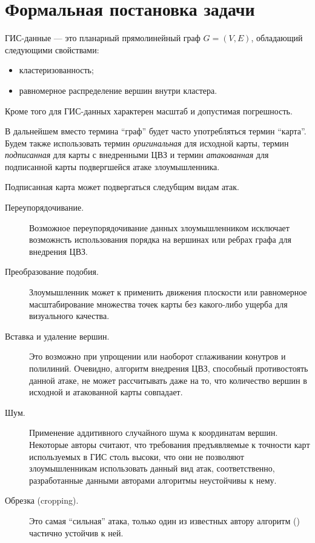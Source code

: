 \section{Формальная постановка задачи}
\label{sec:prob_def}

ГИС-данные --- это планарный прямолинейный граф $G = (V, E)$, обладающий следующими свойствами:
\begin{itemize}
    \item кластеризованность;
    \item равномерное распределение вершин внутри кластера.
\end{itemize}
Кроме того для ГИС-данных характерен масштаб и допустимая погрешность.

В дальнейшем вместо термина ``граф'' будет часто употребляться термин ``карта''. Будем также использовать термин 
\textit{оригинальная} для исходной карты, термин \textit{подписанная} для карты с внедренными 
ЦВЗ и термин \textit{атакованная} для подписанной карты подвергшейся атаке злоумышленника.

Подписанная карта может подвергаться следубщим видам атак.
\begin{description}
    \item[Переупорядочивание.] Возможное переупорядочивание данных злоумышленником исключает возможнсть 
    использования порядка на вершинах или ребрах графа для внедрения ЦВЗ.
    \item[Преобразование подобия.] Злоумышленник может к применить движения плоскости или 
    равномерное масштабирование множества точек карты без какого-либо ущерба для визуального качества. 
    \item[Вставка и удаление вершин.] Это возможно при упрощении или наоборот сглаживании конутров и полилиний. 
    Очевидно, алгоритм внедрения ЦВЗ, способный противостоять данной атаке, не может рассчитывать даже на то, что количество вершин в исходной и атакованной карты совпадает.
    \item[Шум.] Применение аддитивного случайного шума к координатам вершин. Некоторые авторы \cite{Kim, Shao, Bazin} считают, 
    что требования предъявляемые к точности карт используемых в ГИС столь высоки, что они не позволяют злоумышленникам использовать данный вид атак,
    соответственно, разработанные данными авторами алгоритмы неустойчивы к нему.
    \item[Обрезка (cropping).] Это самая ``сильная'' атака, только один из известных автору алгоритм (\cite{Ohbuchi}) частично устойчив к ней.
\end{description}  

